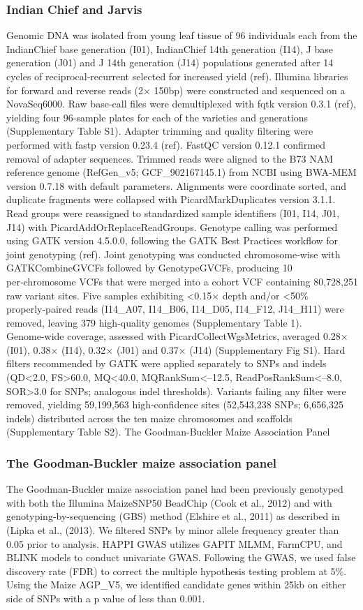 \documentclass[pdflatex,sn-mathphys-num]{sn-jnl}%
\theoremstyle{thmstyleone}%
\theoremstyle{thmstyletwo}%
\theoremstyle{thmstylethree}%
\begin{document}
\subsubsection{Indian Chief and Jarvis }
Genomic DNA was isolated from young leaf tissue of 96 individuals each from the IndianChief base generation (I01), IndianChief 14th generation (I14), J base generation (J01) and J 14th generation (J14) populations generated after 14 cycles of reciprocal‑recurrent selected for increased yield (ref). Illumina libraries for forward and reverse reads (2× 150bp) were constructed and sequenced on a NovaSeq6000. Raw base‑call files were demultiplexed with fqtk version 0.3.1 (ref), yielding four 96‑sample plates for each of the varieties and generations (Supplementary Table S1).
Adapter trimming and quality filtering were performed with fastp version 0.23.4 (ref). FastQC version 0.12.1 confirmed removal of adapter sequences. Trimmed reads were aligned to the B73 NAM reference genome (RefGen\_v5; GCF\_902167145.1) from NCBI using BWA‑MEM version 0.7.18 with default parameters. Alignments were coordinate sorted, and duplicate fragments were collapsed with PicardMarkDuplicates version 3.1.1. Read groups were reassigned to standardized sample identifiers (I01, I14, J01, J14) with PicardAddOrReplaceReadGroups.
Genotype calling was performed using GATK version 4.5.0.0, following the GATK Best Practices workflow for joint genotyping (ref). Joint genotyping was conducted chromosome‑wise with GATKCombineGVCFs followed by GenotypeGVCFs, producing 10 per‑chromosome VCFs that were merged into a cohort VCF containing 80,728,251 raw variant sites. Five samples exhibiting <0.15× depth and/or <50\% properly‑paired reads (I14\_A07, I14\_B06, I14\_D05, I14\_F12, J14\_H11) were removed, leaving 379 high‑quality genomes (Supplementary Table 1). Genome‑wide coverage, assessed with PicardCollectWgsMetrics, averaged 0.28× (I01), 0.38× (I14), 0.32× (J01) and 0.37× (J14) (Supplementary Fig S1). Hard filters recommended by GATK were applied separately to SNPs and indels (QD<2.0, FS>60.0, MQ<40.0, MQRankSum<–12.5, ReadPosRankSum<–8.0, SOR>3.0 for SNPs; analogous indel thresholds). Variants failing any filter were removed, yielding 59,199,563 high‑confidence sites (52,543,238 SNPs; 6,656,325 indels) distributed across the ten maize chromosomes and scaffolds (Supplementary Table S2). 
The Goodman-Buckler Maize Association Panel

\subsubsection{The Goodman-Buckler maize association panel}
The Goodman-Buckler maize association panel had been previously genotyped with both the Illumina MaizeSNP50 BeadChip (Cook et al., 2012) and with genotyping-by-sequencing (GBS) method (Elshire et al., 2011) as described in (Lipka et al., (2013). We filtered SNPs by minor allele frequency greater than 0.05 prior to analysis. HAPPI GWAS utilizes GAPIT MLMM, FarmCPU, and BLINK models to conduct univariate GWAS. Following the GWAS, we used false discovery rate (FDR) to correct the multiple hypothesis testing problem at 5\%. Using the Maize AGP\_V5, we identified candidate genes within 25kb on either side of SNPs with a p value of less than 0.001. 
\end{document}
